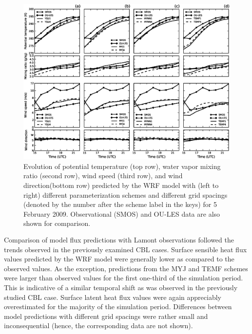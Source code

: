 \begin{figure}[ht!]
\begin{center}
\includegraphics[width=\textwidth]{figures/chapter4/meteogram_grid_20090205}
\end{center}
\caption{Evolution of potential temperature (top row), water vapor mixing ratio (second row), wind speed (third row), and wind direction(bottom row) predicted by the WRF model with (left to right) different parameterization schemes and different grid spacings (denoted by the number after the scheme label in the keys) for 5 February 2009. Observational (SMOS) and OU-LES data are also shown for comparison.}
\label{figure428}
\end{figure}


Comparison of model flux predictions with Lamont observations followed the trends observed in the previously examined CBL cases. Surface sensible heat flux values predicted by the WRF model were generally lower as compared to the observed values. As the exception, predictions from the MYJ and TEMF schemes were larger than observed values for the first one-third of the simulation period. This is indicative of a similar temporal shift as was observed in the previously studied CBL case. Surface latent heat flux values were again appreciably overestimated for the majority of the simulation period. Differences between model predictions with different grid spacings were rather small and inconsequential (hence, the corresponding data are not shown). 

